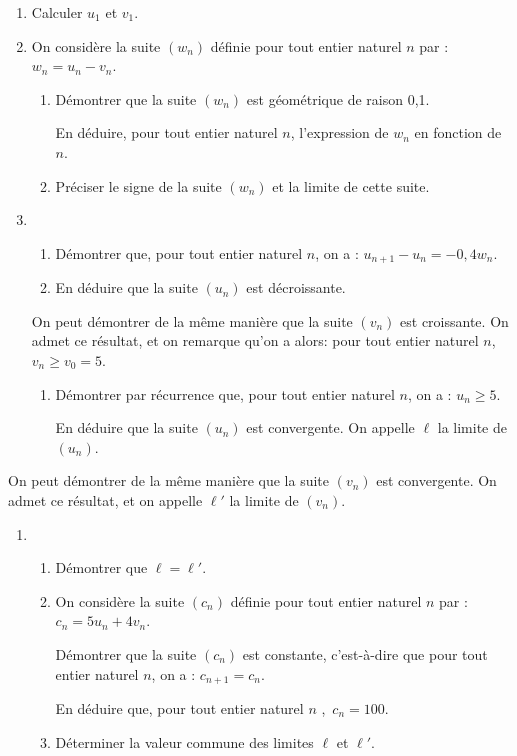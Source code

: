 \documentclass[11pt]{article}
\begin{document}
\begin{enumerate}
\item Calculer $u_1$ et $v_1$.
\item On considère la suite $\left(w_n\right)$ définie pour tout entier naturel $n$ par : $w_n = u_n - v_n$.
	\begin{enumerate}
		\item Démontrer que la suite $\left(w_n\right)$ est géométrique de raison 0,1.
		
En déduire, pour tout entier naturel $n$, l'expression de $w_n$ en fonction de $n$.
		\item Préciser le signe de la suite $\left(w_n\right)$  et la limite de cette suite.
	\end{enumerate}
\item 
	\begin{enumerate}
		\item Démontrer que, pour tout entier naturel $n$, on a : $u_{n+1} - u_n = - 0,4 w_n$.
		\item En déduire que la suite $\left(u_n\right)$ est décroissante.

\end{enumerate}
		
On peut démontrer de la même manière que la suite $\left(v_n\right)$ est croissante. On admet ce résultat, et on remarque qu'on a alors: pour tout entier naturel $n$,\, $v_n \geqslant v_0 = 5$.
\begin{enumerate}[resume]
		\item Démontrer par récurrence que, pour tout entier naturel $n$, on a : $u_n \geqslant 5$. 
		
En déduire que la suite $\left(u_n\right)$ est convergente. On appelle $\ell$ la limite de $\left(u_n\right)$.
	\end{enumerate}
\end{enumerate}
	
On peut démontrer de la même manière que la suite $\left(v_n\right)$ est convergente. On admet ce résultat, et on appelle $\ell'$ la limite de $\left(v_n\right)$.
\begin{enumerate}[resume]
\item 
	\begin{enumerate}
		\item Démontrer que $\ell = \ell'$.
		\item On considère la suite $\left(c_n\right)$ définie pour tout entier naturel $n$ par : $c_n = 5u_n + 4v_n$.
		
Démontrer que la suite $\left(c_n\right)$ est constante, c'est-à-dire que pour tout entier naturel $n$, on a : $c_{n+1} = c_n$. 

En déduire que, pour tout entier naturel $n$ ,\, $c_n = 100$.
		\item Déterminer la valeur commune des limites  $\ell$ et $\ell'$.
	\end{enumerate}
\end{enumerate}
\end{document}
